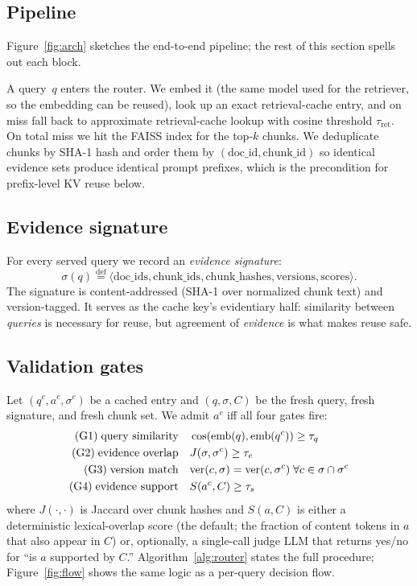 \documentclass[11pt]{article}
\newcommand{\eqdef}{\stackrel{\mathrm{def}}{=}}
\begin{document}
\subsection{Pipeline}
Figure~\ref{fig:arch} sketches the end-to-end pipeline; the rest of
this section spells out each block.

A query~$q$ enters the router. We embed it (the same model used for the
retriever, so the embedding can be reused), look up an exact retrieval-cache
entry, and on miss fall back to approximate retrieval-cache lookup with
cosine threshold $\tau_{\mathrm{ret}}$. On total miss we hit the FAISS index
for the top-$k$ chunks. We deduplicate chunks by SHA-1 hash and order them
by $(\mathrm{doc\_id}, \mathrm{chunk\_id})$ so identical evidence sets
produce identical prompt prefixes, which is the precondition for
prefix-level KV reuse below.

\subsection{Evidence signature}
For every served query we record an \emph{evidence signature}:
\begin{equation}
\sigma(q) \eqdef \bigl\langle \mathrm{doc\_ids}, \mathrm{chunk\_ids},
                              \mathrm{chunk\_hashes}, \mathrm{versions},
                              \mathrm{scores} \bigr\rangle.
\end{equation}
The signature is content-addressed (SHA-1 over normalized chunk text) and
version-tagged. It serves as the cache key's evidentiary half: similarity
between \emph{queries} is necessary for reuse, but agreement of
\emph{evidence} is what makes reuse safe.

\subsection{Validation gates}
Let $(q^{c}, a^{c}, \sigma^{c})$ be a cached entry and $(q, \sigma, C)$
be the fresh query, fresh signature, and fresh chunk set. We admit $a^{c}$
iff all four gates fire:
\begin{align}
\text{(G1)\;query similarity}\quad   & \cos(\mathrm{emb}(q),\mathrm{emb}(q^{c})) \ge \tau_{q} \label{eq:g1}\\
\text{(G2)\;evidence overlap}\quad   & J(\sigma, \sigma^{c}) \ge \tau_{e} \label{eq:g2}\\
\text{(G3)\;version match}\quad      & \mathrm{ver}(c, \sigma) = \mathrm{ver}(c, \sigma^{c}) \;\forall c \in \sigma \cap \sigma^{c} \label{eq:g3}\\
\text{(G4)\;evidence support}\quad   & S(a^{c}, C) \ge \tau_{s} \label{eq:g4}
\end{align}
where $J(\cdot,\cdot)$ is Jaccard over chunk hashes and $S(a, C)$ is either
a deterministic lexical-overlap score (the default; the fraction of
content tokens in $a$ that also appear in $C$) or, optionally, a
single-call judge LLM that returns yes/no for ``is $a$ supported by $C$.''
Algorithm~\ref{alg:router} states the full procedure; Figure~\ref{fig:flow}
shows the same logic as a per-query decision flow.
\end{document}
